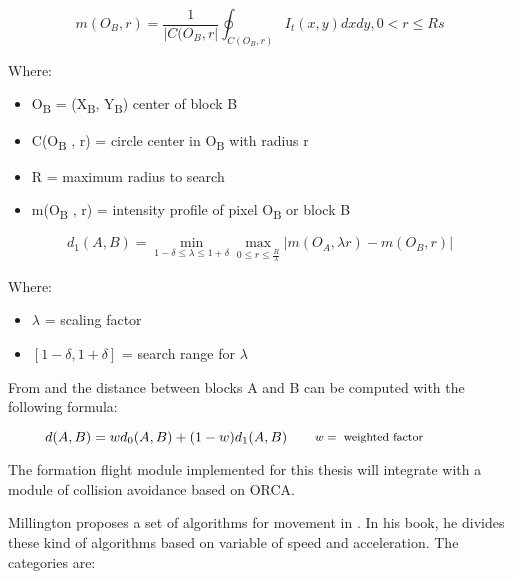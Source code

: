 \begin{equation}
m(O_{B}, r) = \frac{1}{ | C(O_{B}, r |}\oint_{C(O_{B}, r)}I_{t}(x, y)dxdy, 0 < r \leq R
  \label{eqn:intensity-profile-pixel}s
\end{equation}

Where: 
\begin {itemize}
  \item {O}\textsubscript{B} = (X\textsubscript{B}, Y\textsubscript{B}) center of block B
  \item C(O\textsubscript{B} , r) = circle center in O\textsubscript{B}  with radius r
  \item R = maximum radius to search
  \item m(O\textsubscript{B} , r) = intensity profile of pixel O\textsubscript{B}  or block B
\end {itemize}

 
\begin{equation}
d_{1}(A, B) = \min_{1 - \delta \leq  \lambda \leq 1 + \delta} \max_{0 \leq r \leq \frac{R}{\lambda}} | m(O_{A}, \lambda r) - m(O_{B}, r) |
\label{eqn:distance-block}
\end{equation}

Where: 
\begin {itemize}
  \item $\lambda$ = scaling factor
  \item $[1 - \delta, 1 + \delta]$  = search range for $\lambda$
\end {itemize}

From  and 
 the distance between blocks A and B
can be computed with the following formula:

\begin{equation}
d(A, B) = w d_{0}(A, B) + (1 - w) d_{1}(A, B)
\qquad\parbox{4.0cm}{\footnotesize$\begin{aligned} 
  w &= \text{ weighted factor }
  \end{aligned}$}
\label{eqn: distance-block}
\end{equation}

The formation flight module implemented for this thesis will integrate with 
a module of collision avoidance based on ORCA.

Millington proposes a set of algorithms for movement in \cite{ai-games}.
In his book, he divides these kind of algorithms based on variable of speed and
acceleration. The categories are:

